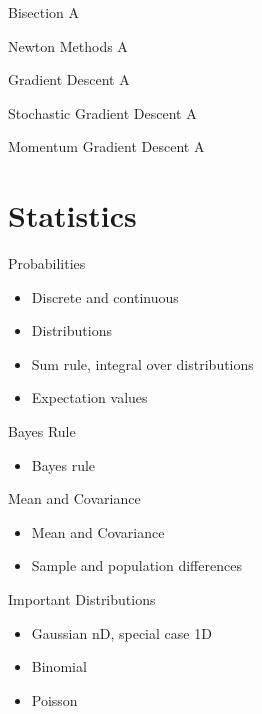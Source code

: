   \begin{frame}{Bisection}
    A
  \end{frame}

  \begin{frame}{Newton Methods}
    A
  \end{frame}

  \begin{frame}{Gradient Descent}
    A
  \end{frame}

  \begin{frame}{Stochastic Gradient Descent}
    A
  \end{frame}

  \begin{frame}{Momentum Gradient Descent}
    A
  \end{frame}

  \section{Statistics}
  \begin{frame}{Probabilities}
    \begin{itemize}
      \item Discrete and continuous
      \item Distributions
      \item Sum rule, integral over distributions
      \item Expectation values
    \end{itemize}
  \end{frame}

  \begin{frame}{Bayes Rule}
    \begin{itemize}
      \item Bayes rule
    \end{itemize}
  \end{frame}

  \begin{frame}{Mean and Covariance}
    \begin{itemize}
      \item Mean and Covariance
      \item Sample and population differences
    \end{itemize}
  \end{frame}

  \begin{frame}{Important Distributions}
    \begin{itemize}
      \item Gaussian nD, special case 1D
      \item Binomial
      \item Poisson
    \end{itemize}
  \end{frame}


